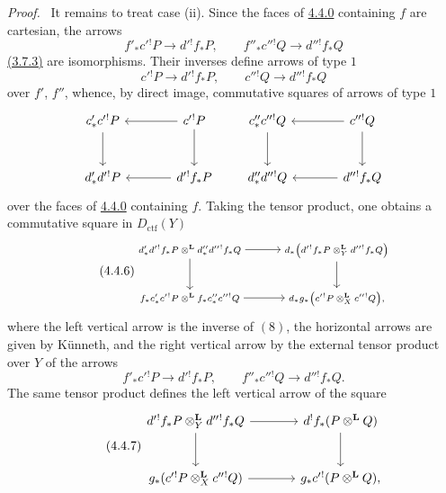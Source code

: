 \documentclass[11pt]{article}
\newenvironment{prooftext}[1][Proof]{\par\noindent\emph{#1.}\ }{\par\medskip}
\providecommand{\Dctf}{D_{\mathrm{ctf}}}
\providecommand{\Dctf}{D_{\mathrm{ctf}}}
\begin{document}
\begin{prooftext}[Proof]
It remains to treat case (ii). Since the faces of \hyperref[sga5:III:equation:4.4.0]{4.4.0} containing $f$ are cartesian, the arrows
\[
f'_*c'{}^!P\longrightarrow d'{}^!f_*P,\qquad
f''_*c''{}^!Q\longrightarrow d''{}^!f_*Q
\]
\hyperref[sga5:III:equation:3.7.3]{(3.7.3)} are isomorphisms. Their inverses define arrows of type $1$
\[
c'{}^!P\longrightarrow d'{}^!f_*P,\qquad
c''{}^!Q\longrightarrow d''{}^!f_*Q
\]
over $f'$, $f''$, whence, by direct image, commutative squares of arrows of type $1$
\[
\begin{tikzcd}[column sep=large,row sep=large]
c'_*c'{}^!P \arrow[d] & c'{}^!P\arrow[l]\arrow[d]\\
d'_*d'{}^!P & d'{}^!f_*P\arrow[l]
\end{tikzcd}
\qquad
\begin{tikzcd}[column sep=large,row sep=large]
c''_*c''{}^!Q \arrow[d] & c''{}^!Q\arrow[l]\arrow[d]\\
d''_*d''{}^!Q & d''{}^!f_*Q\arrow[l]
\end{tikzcd}
\]
over the faces of \hyperref[sga5:III:equation:4.4.0]{4.4.0} containing $f$. Taking the tensor product, one obtains a commutative square in $\Dctf(Y)$
\begin{equation}
\tag{4.4.6}\label{sga5:III:equation:4.4.6}
{\scriptsize
\begin{tikzcd}[column sep=large,row sep=large]
d'_*d'{}^!f_*P\otimes^{\mathbf L}d''_*d''{}^!f_*Q
 \arrow[r]\arrow[d] &
d_*\bigl(d'{}^!f_*P\otimes_Y^{\mathbf L}d''{}^!f_*Q\bigr)\arrow[d]\\
f_*c'_*c'{}^!P\otimes^{\mathbf L}f_*c''_*c''{}^!Q
 \arrow[r] &
d_*g_*\bigl(c'{}^!P\otimes_X^{\mathbf L}c''{}^!Q\bigr),
\end{tikzcd}
}
\end{equation}
where the left vertical arrow is the inverse of $(8)$, the horizontal arrows are given by Künneth, and the right vertical arrow by the external tensor product over $Y$ of the arrows
\[
f'_*c'{}^!P\longrightarrow d'{}^!f_*P,\qquad
f''_*c''{}^!Q\longrightarrow d''{}^!f_*Q.
\]
The same tensor product defines the left vertical arrow of the square
\begin{equation}
\tag{4.4.7}\label{sga5:III:equation:4.4.7}
\begin{tikzcd}[column sep=large,row sep=large]
d'{}^!f_*P\otimes_Y^{\mathbf L}d''{}^!f_*Q
 \arrow[r]\arrow[d] &
d^!f_*(P\otimes^{\mathbf L}Q)\arrow[d]\\
g_*(c'{}^!P\otimes_X^{\mathbf L}c''{}^!Q)
 \arrow[r] &
g_*c'{}^!(P\otimes^{\mathbf L}Q),
\end{tikzcd}

\end{equation}
\end{prooftext}
\end{document}

